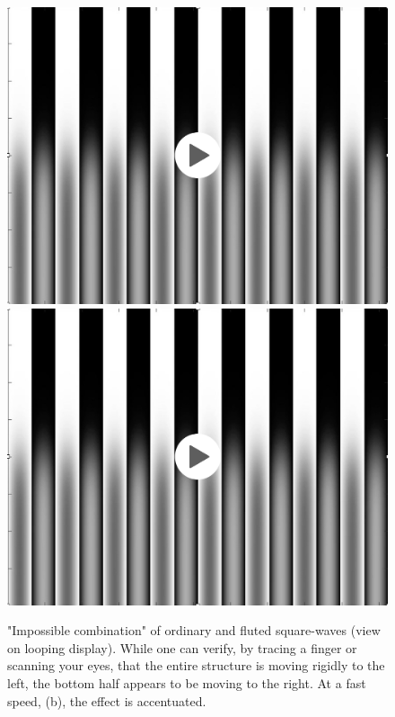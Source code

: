 \begin{figure}
\centerline{
{
\href{https://groups.csail.mit.edu/vision/cvbook/videos/blendedSlowLoop.mov}{\includegraphics[width=0.2\linewidth]{figures/temporal_filters/blendFrame.jpg}}}
{
\href{https://groups.csail.mit.edu/vision/cvbook/videos/fastBlendLoop.mov}{\includegraphics[width=0.2\linewidth]{figures/temporal_filters/blendFrame.jpg}}}
}
\caption{"Impossible combination" of ordinary and  fluted square-waves (view on looping display).  While one can verify, by tracing a finger or scanning your eyes, that the entire structure is moving rigidly to the left, the bottom half appears to be moving to the right.  At a fast speed, (b), the effect is accentuated.}
\label{fig:blends}
\end{figure}



%
%
%
%


